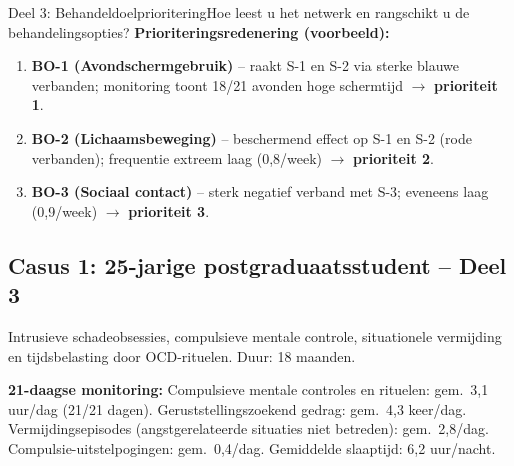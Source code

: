 \documentclass[11pt,a4paper]{article}
\begin{document}
\begin{voorbeeldbox}{Deel 3: Behandeldoelprioritering}{Hoe leest u het netwerk en rangschikt u de behandelingsopties?}
\medskip
\textbf{Prioriteringsredenering (voorbeeld):}
\begin{enumerate}[topsep=2pt,itemsep=1pt,label=\arabic*.]
\item \textbf{BO-1 (Avondschermgebruik)} -- raakt S-1 en S-2 via sterke blauwe verbanden;
monitoring toont 18/21 avonden hoge schermtijd $\rightarrow$ \textbf{prioriteit 1}.
\item \textbf{BO-2 (Lichaamsbeweging)} -- beschermend effect op S-1 en S-2 (rode verbanden);
frequentie extreem laag (0,8/week) $\rightarrow$ \textbf{prioriteit 2}.
\item \textbf{BO-3 (Sociaal contact)} -- sterk negatief verband met S-3; eveneens laag
(0,9/week) $\rightarrow$ \textbf{prioriteit 3}.
\end{enumerate}
\end{voorbeeldbox}

\vspace{0.5em}

\newpage
\subsection*{Casus 1: 25-jarige postgraduaatsstudent -- Deel 3}

\begin{complaintbox}[title={Casus 1: 25-jarige postgraduaatsstudent}]
\small Intrusieve schadeobsessies, compulsieve mentale controle, situationele vermijding en tijdsbelasting door OCD-rituelen. Duur: 18 maanden.
\end{complaintbox}

\begin{monitorbox}
\small\textbf{21-daagse monitoring:} Compulsieve mentale controles en rituelen: gem.\ 3,1 uur/dag (21/21 dagen). Geruststellingszoekend gedrag: gem.\ 4,3 keer/dag. Vermijdingsepisodes (angstgerelateerde situaties niet betreden): gem.\ 2,8/dag. Compulsie-uitstelpogingen: gem.\ 0,4/dag. Gemiddelde slaaptijd: 6,2 uur/nacht.
\end{monitorbox}
\end{document}
